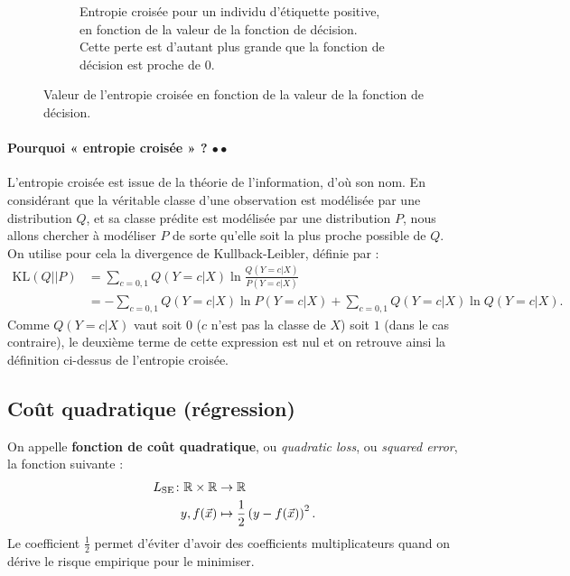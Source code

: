 \begin{figure}[h]
\begin{subfigure}[t]{0.43\textwidth}
    \caption{Entropie croisée pour un individu d'étiquette positive, en
      fonction de la valeur de la fonction de décision. Cette perte est
      d'autant plus grande que la fonction de décision est proche de $0$.}
    \label{fig:logistic_loss_pos}
  \end{subfigure}
  \caption{Valeur de l'entropie croisée en fonction de la valeur de la fonction de décision.}
  \label{fig:logistic_loss}
\end{figure}


\paragraph{Pourquoi « entropie croisée » ? $\bullet\bullet$ } 
L'entropie croisée est issue de la théorie de l'information, d'où son nom. En
considérant que la véritable classe d'une observation est modélisée par une
distribution $Q$, et sa classe prédite est modélisée par une distribution $P$,
nous allons chercher à modéliser $P$ de sorte qu'elle soit la plus proche
possible de $Q$. On utilise pour cela la divergence de Kullback-Leibler,
définie par :
\begin{align*}
  \text{KL}(Q||P) & = \sum_{c=0, 1} Q(Y=c|X) \ln \frac{Q(Y=c|X)}{P(Y=c|X)} \\
           & = - \sum_{c=0, 1} Q(Y=c|X) \ln P(Y=c|X) + 
             \sum_{c=0, 1} Q(Y=c|X) \ln Q(Y=c|X).
\end{align*}
Comme $Q(Y=c|X)$ vaut soit $0$ ($c$ n'est pas la classe de $X$) soit
$1$ (dans le cas contraire), le deuxième terme de cette expression est nul
et on retrouve ainsi la définition ci-dessus de l'entropie croisée.

\subsection{Coût quadratique (régression)}
\label{sec:quadratic_loss}
On appelle \textbf{fonction de coût quadratique}, ou {\it quadratic loss}, ou
{\it squared error}, la fonction suivante :
\begin{equation}
  \begin{split}
    L_{\text{SE}}\colon\RR \times \RR & \to \RR \\ 
    y, f(\xx) & \mapsto \frac12 \left(y - f(\xx)\right)^2.
\end{split}
  \label{eq:quadratic_loss}  
\end{equation}
Le coefficient $\frac{1}{2}$ permet d'éviter d'avoir des coefficients
multiplicateurs quand on dérive le risque empirique pour le minimiser.

